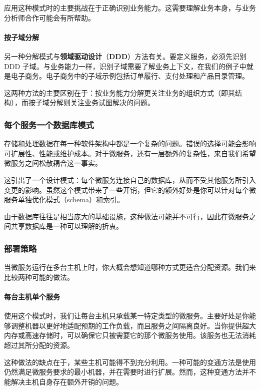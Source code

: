 应用这种模式时的主要挑战在于正确识别业务能力。这需要理解业务本身，与业务分析师合作可能会有所帮助。

\paragraph{按子域分解}

\label{idx:1410}
另一种分解模式与\textbf{领域驱动设计}（\textbf{DDD}）方法有关。要定义服务，必须先识别 DDD 子域。与业务能力一样，识别子域需要了解业务上下文，在我们的例子中就是电子商务。电子商务中的子域示例包括订单履行、支付处理和产品目录管理。

\label{idx:1411}
这两种方法的主要区别在于：按业务能力分解更关注业务的组织方式（即其结构），而按子域分解则关注业务试图解决的问题。

\subsubsection{每个服务一个数据库模式}

\label{idx:1412}
存储和处理数据在每一种软件架构中都是一个复杂的问题。错误的选择可能会影响可扩展性、性能或维护成本。对于微服务，还有一层额外的复杂性，来自我们希望微服务之间松散耦合这一事实。

这引出了一个设计模式：每个微服务连接自己的数据库，从而不受其他服务所引入变更的影响。虽然这个模式带来了一些开销，但它的额外好处是你可以针对每个微服务单独优化模式（schema）和索引。

\label{idx:1413}
由于数据库往往是相当庞大的基础设施，这种做法可能并不可行，因此在微服务之间共享数据库是一种可以理解的折衷。

\subsubsection{部署策略}

\label{idx:1414}
当微服务运行在多台主机上时，你大概会想知道哪种方式更适合分配资源。我们来比较两种可能的做法。

\paragraph{每台主机单个服务}

\label{idx:1415}
使用这个模式时，我们让每台主机只承载某一特定类型的微服务。主要好处是你能够调整机器以更好地适配预期的工作负载，而且服务之间隔离良好。当你提供超大内存或高速存储时，可以确保它只被需要它的那个微服务使用。该服务也无法消耗超过其所分配的资源。

这种做法的缺点在于，某些主机可能得不到充分利用。一种可能的变通方法是使用仍然满足微服务要求的最小机器，并在需要时进行扩展。然而，这种变通方法并不能解决主机自身存在额外开销的问题。

